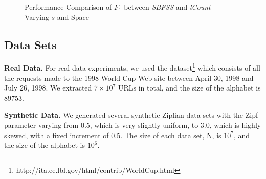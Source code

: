 \documentclass[conference]{IEEEtran}
\begin{document}
\begin{figure}[!t]
\begin{minipage}{0.23\linewidth}
	\end{minipage}
	\begin{minipage}{0.23\linewidth}
		\centering
	\end{minipage}
	\caption{Performance Comparison of $F_1$ between \emph{SBFSS} and \emph{lCount} - Varying $s$ and Space }
	\label{fig:F1}
\end{figure}
\subsection{Data Sets}
\textbf{Real Data.} For real data experiments, we used the dataset\footnote{http://ita.ee.lbl.gov/html/contrib/WorldCup.html} which consists of all the requests made to the 1998 World Cup Web site between April 30, 1998 and July 26, 1998. We extracted $7\times10^7$ URLs in total, and the size of the alphabet is 89753.\par
\textbf{Synthetic Data.} We generated several synthetic Zipfian data sets with the Zipf parameter varying from 0.5, which is very slightly uniform, to 3.0, which is highly skewed, with a fixed increment of 0.5. The size of each data set, N, is $10^7$, and the size of the alphabet is $10^6$.
\end{document}
